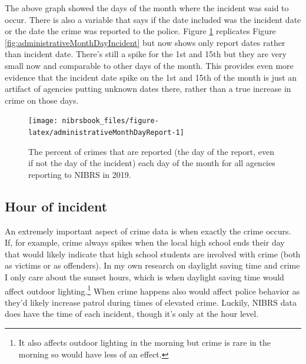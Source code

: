 \documentclass[
  12pt,
  openany]{book}
\begin{document}
The above graph showed the days of the month where the incident was said to occur. There is also a variable that says if the date included was the incident date or the date the crime was reported to the police. Figure \ref{fig:administrativeMonthDayReport} replicates Figure \ref{fig:administrativeMonthDayIncident} but now shows only report dates rather than incident date. There's still a spike for the 1st and 15th but they are very small now and comparable to other days of the month. This provides even more evidence that the incident date spike on the 1st and 15th of the month is just an artifact of agencies putting unknown dates there, rather than a true increase in crime on those days.

\begin{figure}

{\centering \texttt{[image: nibrsbook\_files/figure-latex/administrativeMonthDayReport-1]} 

}

\caption{The percent of crimes that are reported (the day of the report, even if not the day of the incident) each day of the month for all agencies reporting to NIBRS in 2019.}\label{fig:administrativeMonthDayReport}
\end{figure}

\hypertarget{hour-of-incident}{%
\subsection{Hour of incident}\label{hour-of-incident}}

An extremely important aspect of crime data is when exactly the crime occurs. If, for example, crime always spikes when the local high school ends their day that would likely indicate that high school students are involved with crime (both as victims or as offenders). In my own research on daylight saving time and crime I only care about the sunset hours, which is when daylight saving time would affect outdoor lighting.\footnote{It also affects outdoor lighting in the morning but crime is rare in the morning so would have less of an effect.} When crime happens also would affect police behavior as they'd likely increase patrol during times of elevated crime. Luckily, NIBRS data does have the time of each incident, though it's only at the hour level.
\end{document}
